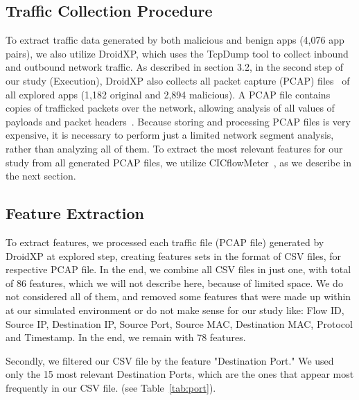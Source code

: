 \subsection{Traffic Collection Procedure}\label{sec:traffic}

To extract traffic data generated by both malicious and benign apps (4,076 app pairs), we also utilize DroidXP, which uses the TcpDump tool to collect inbound and outbound network traffic. As described in section 3.2, in the second step of our study (Execution), DroidXP also collects all packet capture (PCAP) files~\cite{DBLP:conf/iv/UhlarHR21} of all explored apps (1,182 original and 2,894 malicious). A PCAP file contains copies of trafficked packets over the network, allowing analysis of all values of payloads and packet headers~\cite{DBLP:conf/iv/UhlarHR21}. Because storing and processing PCAP files is very expensive, it is necessary to perform just a limited network segment analysis, rather than analyzing all of them. To extract the most relevant features for our study from all generated PCAP files, we utilize CICflowMeter~\cite{DBLP:conf/icissp/LashkariDMG17}, as we describe in the next section.

\subsection{Feature Extraction}\label{sec:extraction}

To extract features, we processed each traffic file (PCAP file) generated by DroidXP at explored step, creating features sets in the format of CSV files, for respective PCAP file. In the end, we combine all CSV files in just one, with total of 86 features, which we will not describe here, because of limited space. We do not considered all of them, and removed some features that were made up within at our simulated environment or do not make sense for our study like: Flow ID, Source IP, Destination IP, Source Port, Source MAC, Destination MAC, Protocol and Timestamp. In the end, we remain with 78 features.

Secondly, we filtered our CSV file by the feature "Destination Port." We used only the 15 most relevant Destination Ports, which are the ones that appear most frequently in our CSV file. (see Table~\ref{tab:port}).

